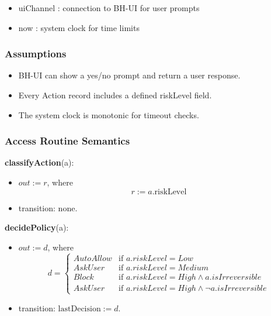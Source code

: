 \documentclass[12pt, titlepage]{article}
\begin{document}
\begin{itemize}
  \item uiChannel : connection to BH-UI for user prompts
  \item now : system clock for time limits
\end{itemize}

\subsubsection{Assumptions}

\begin{itemize}
  \item BH-UI can show a yes/no prompt and return a user response.
  \item Every Action record includes a defined riskLevel field.
  \item The system clock is monotonic for timeout checks.
\end{itemize}

\subsubsection{Access Routine Semantics}

\noindent
\textbf{classifyAction}(a):
\begin{itemize}
  \item $out := r$, where
  \[
    r := a.\text{riskLevel}
  \]
  \item transition: none.
\end{itemize}

\noindent
\textbf{decidePolicy}(a):
\begin{itemize}
  \item $out := d$, where
  \[
    d =
    \begin{cases}
      AutoAllow & \text{if } a.riskLevel = Low\\
      AskUser & \text{if } a.riskLevel = Medium\\
      Block & \text{if } a.riskLevel = High \land a.isIrreversible\\
      AskUser & \text{if } a.riskLevel = High \land \neg a.isIrreversible
    \end{cases}
  \]
  \item transition: $\text{lastDecision} := d$.
\end{itemize}
\end{document}
